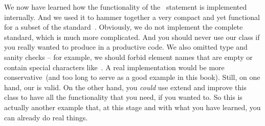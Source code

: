 We now have learned how the functionality of the ~statement is implemented internally.
And we used it to hammer together a very compact and yet functional  for a subset of the  standard~\cite{BPSMM2008EMLX1FE}.
Obviously, we do not implement the complete standard, which is much more complicated.
And you should never use our class if you really wanted to produce  in a productive code.
We also omitted type and sanity checks -- for example, we should forbid element names that are empty or contain special characters like~\textil{<}.
A real implementation would be more conservative~(and too long to serve as a good example in this book).
Still, on one hand, our  is valid.
On the other hand, you \emph{could} use extend and improve this class to have all the functionality that you need, if you wanted to.
So this is actually another example that, at this stage and with what you have learned, you can already do real things.%
%
\FloatBarrier%
\endhsection%
%
%
%
